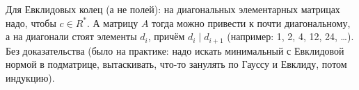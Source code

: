 Для Евклидовых колец (а не полей): на диагональных элементарных матрицах надо, чтобы $c \in R^*$.
А матрицу $A$ тогда можно привести к почти диагональному, а на диагонали стоят элементы $d_i$, причём $d_i \mid d_{i+1}$ (например: 1, 2, 4, 12, 24, \dots).
Без доказательства (было на практике: надо искать минимальный с Евклидовой нормой в подматрице, вытаскивать, что-то занулять по Гауссу и Евклиду, потом индукцию).
